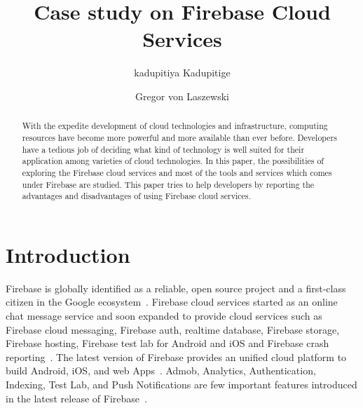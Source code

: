 \title{Case study on Firebase Cloud Services}


\author{kadupitiya Kadupitige}

\author{Gregor von Laszewski}


\renewcommand{\shortauthors}{G. v. Laszewski}


\begin{abstract}
With the expedite development of cloud technologies and infrastructure, 
computing resources have become more powerful and more available than ever 
before. Developers have a tedious job of deciding what kind of technology is 
well suited for their application among varieties of cloud technologies. In 
this paper, the possibilities of exploring the Firebase cloud services and most 
of the tools and services which comes under Firebase are studied. This paper 
tries to help developers by reporting the advantages and disadvantages of using 
Firebase cloud services.
\end{abstract}



\maketitle


\section{Introduction}

Firebase is globally identified as a reliable, open source project and a 
first-class citizen in the Google ecosystem~\cite{hid-sp18-409-www-firebase}. 
Firebase cloud services started as an online chat message service and soon 
expanded to provide cloud services such as Firebase cloud messaging, Firebase 
auth, realtime database, Firebase storage, Firebase hosting, Firebase test lab 
for Android and iOS and Firebase crash 
reporting~\cite{hid-sp18-409-www-firebase-official}. The latest version of 
Firebase provides an unified cloud platform to build Android, iOS, and web 
Apps~\cite{hid-sp18-409-www-firebase-official}.  Admob, Analytics, 
Authentication, Indexing, Test Lab, and Push Notifications are few important 
features introduced in the latest release of 
Firebase~\cite{hid-sp18-409-www-firebase-official}. 

